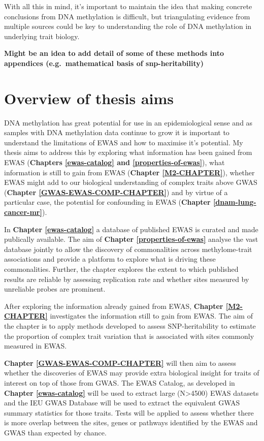 \documentclass[11pt,twoside]{bristolthesis}
\begin{document}
With all this in mind, it's important to maintain the idea that making concrete conclusions from DNA methylation is difficult, but triangulating evidence from multiple sources could be key to understanding the role of DNA methylation in underlying trait biology.

\textbf{Might be an idea to add detail of some of these methods into appendices (e.g.~mathematical basis of snp-heritability)}

\hypertarget{overview-of-thesis-aims}{%
\section{Overview of thesis aims}\label{overview-of-thesis-aims}}

DNA methylation has great potential for use in an epidemiological sense and as samples with DNA methylation data continue to grow it is important to understand the limitations of EWAS and how to maximise it's potential. My thesis aims to address this by exploring what information has been gained from EWAS (\textbf{Chapters \ref{ewas-catalog} and \ref{properties-of-ewas}}), what information is still to gain from EWAS (\textbf{Chapter \ref{M2-CHAPTER}}), whether EWAS might add to our biological understanding of complex traits above GWAS (\textbf{Chapter \ref{GWAS-EWAS-COMP-CHAPTER}}) and by virtue of a particular case, the potential for confounding in EWAS (\textbf{Chapter \ref{dnam-lung-cancer-mr}}).

In \textbf{Chapter \ref{ewas-catalog}} a database of published EWAS is curated and made publically available. The aim of \textbf{Chapter \ref{properties-of-ewas}} analyse the vast database jointly to allow the discovery of commonalities across methylome-trait associations and provide a platform to explore what is driving these commonalities. Further, the chapter explores the extent to which published results are reliable by assessing replication rate and whether sites measured by unreliable probes are prominent.

After exploring the information already gained from EWAS, \textbf{Chapter \ref{M2-CHAPTER}} investigates the information still to gain from EWAS. The aim of the chapter is to apply methods developed to assess SNP-heritability to estimate the proportion of complex trait variation that is associated with sites commonly measured in EWAS.

\textbf{Chapter \ref{GWAS-EWAS-COMP-CHAPTER}} will then aim to assess whether the discoveries of EWAS may provide extra biological insight for traits of interest on top of those from GWAS. The EWAS Catalog, as developed in \textbf{Chapter \ref{ewas-catalog}} will be used to extract large (N\textgreater4500) EWAS datasets and the IEU GWAS Database will be used to extract the equivalent GWAS summary statistics for those traits. Tests will be applied to assess whether there is more overlap between the sites, genes or pathways identified by the EWAS and GWAS than expected by chance.
\end{document}
